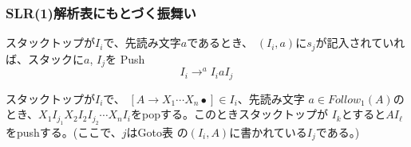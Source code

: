 \documentclass[dvipdfmx]{beamer}
\begin{document}
\begin{frame}
  \frametitle{SLR(1)解析表にもとづく振舞い}
  \begin{list}%
    {} %
    {} %
    \item[(1)] スタックトップが$I_i$で、先読み文字$a$であるとき、
          $(I_i,a)$に$s_j$が記入されていれば、スタックに$a$, $I_j$を
          Push
          \[
            I_i\rightarrow^a I_iaI_j
          \]
    \item[(2)] スタックトップが$I_i$で、
          $[A\rightarrow X_1\cdots X_n\bullet]\in I_i$、先読み文字
          $a\in Follow_1(A)$のとき、$X_1I_{j_1}X_2I_2I_{j_2}\cdots
            X_nI_i$をpopする。このときスタックトップが
          $I_k$とすると$AI_\ell$をpushする。(ここで、$j$はGoto表
          の$(I_i,A)$に書かれている$I_j$である。)
  \end{list}
\end{frame}





\end{document}
